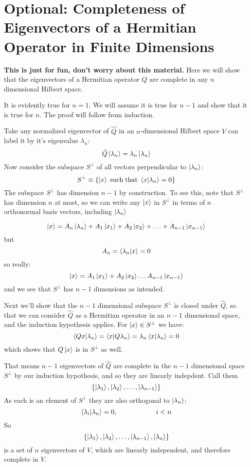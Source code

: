 \documentclass[12pt]{book}
\begin{document}

















\section{Optional:  Completeness of Eigenvectors of a Hermitian Operator in Finite Dimensions}

{\bf This is just for fun, don't worry about this material.}  Here we
will show that the eigenvectors of a Hermitian operator $Q$ are
complete in any $n$ dimensional Hilbert space.

It is evidently true for $n=1$.  We will assume it is true for $n-1$ and show that it is true for $n$.  The proof will follow from induction.

Take any normalized eigenvector of $\hat{Q}$ in an $n$-dimensional Hilbert space $V$ can label it by it's eigenvalue $\lambda_n$:
$$\hat{Q}\ket{\lambda_n} = \lambda_n \ket{\lambda_n}$$
Now consider the subspace $S^\perp$ of all vectors perpendicular to $\ket{\lambda_n}$:
$$S^\perp \equiv \{ \ket{x} \; {\rm such \; that} \; \braket{x|\lambda_n}=0 \}$$
The subspace $S^\perp$ has dimension $n-1$ by construction.  To see
this, note that $S^\perp$ has dimension $n$ at most, so we can write
any $\ket{x}$ in $S^\perp$ in terms of $n$ orthonormal basis vectors, including $\ket{\lambda_n}$

$$\ket{x} = A_n \ket{\lambda_n} + A_1 \ket{x_1} + A_2 \ket{x_2} + \ldots  + A_{n-1} \ket{x_{n-1}}$$
but
$$A_n = \braket{\lambda_n|x} = 0$$
so really:
$$\ket{x} = A_1 \ket{x_1} + A_2 \ket{x_2} \ldots A_{n-1} \ket{x_{n-1}}$$
and we see that $S^\perp$ has $n-1$ dimensions as intended.

Next we'll show that the $n-1$ dimensional subspace $S^\perp$ is closed under $\hat{Q}$, so that 
we can consider $\hat{Q}$ as a Hermitian operator in an $n-1$ dimensional space, and the induction hypothesis applies.  For $\ket{x} \in S^\perp$ we have:
$$\braket{Qx|\lambda_n} = \braket{x| Q\lambda_n} = \lambda_n \braket{x|\lambda_n} = 0$$
which shows that $Q\ket{x}$ is in $S^\perp$ as well.  

That means $n-1$ eigenvectors of $\hat{Q}$ are complete in the $n-1$
dimensional space $S^\perp$ by our induction hypothesis, and so they
are linearly indepdent.  Call them
$$\{\ket{\lambda_1},\ket{\lambda_2}, \ldots, \ket{\lambda_{n-1}}\}$$
As each is an element of $S^\perp$ they are also orthogonal to $\ket{\lambda_n}$:
$$\braket{\lambda_i|\lambda_n} = 0, \hspace{2cm} i<n$$
So
$$\{\ket{\lambda_1}, \ket{\lambda_2}, \ldots, \ket{\lambda_{n-1}}, \ket{\lambda_n}\}$$
is a set of $n$ eigenvectors of $V$, which are linearly independent, and therefore complete in $V$.
\end{document}
